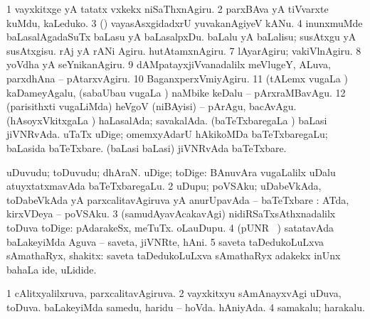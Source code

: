 {\noindent 
\gl{\pagu}
\expl{}
\bmng
\bnum
\num{1}  vayxkitxge yA tatatx vxkekx niSaThxnAgiru. 
\num{2}  parxBAva yA tiVvarxte kuMdu, kaLeduko. 
\num{3}  (\AmA) vayasAsxgidadxrU yuvakanAgiyeV kANu. 
\num{4}  
  
\banum
{} inunxmuMde baLasalAgadaSuTx baLasu yA baLasalpxDu. 
 baLalu yA baLalisu; susAtxgu yA susAtxgisu. 
\eanum
\numie
{}  
\banum
{} rAj yA rANi Agiru. 
 hutAtamxnAgiru. 
\eanum
\numie
\num{7}  lAyarAgiru; vakiVlnAgiru. 
\num{8}  yoVdha yA seYnikanAgiru. 
\num{9}  dAMpatayxjiVvanadalilx meVlugeY, ALuva, parxdhAna -- pAtarxvAgiru. 
\num{10}  BaganxperxVmiyAgiru. 
\num{11}  (tALemx \mo vugaLa \vi) kaDameyAgalu, (sabaUbau \mo vugaLa \vi) naMbike keDalu -- pArxraMBavAgu. 
\num{12}  (parisithxti \mo vugaLiMda) heVgoV (niBAyisi) -- pArAgu, bacAvAgu. 
  
\banum
{} (hAsoyxVkitxgaLa \vi) haLasalAda; savakalAda. 
 (baTeTxbaregaLa \vi) baLasi jiVNRvAda. 
\eanum
\numie
{}  
\banum
{} uTaTx uDige; omemxyAdarU hAkikoMDa baTeTxbaregaLu; baLasida baTeTxbare. 
 (baLasi baLasi) jiVNRvAda baTeTxbare. 
\eanum
\numie
\enum
\emng
\eentry

\bentry
{} 
\gl{\nA}
\expl{}
\bmng
\bnum
{} 
\banum
{} uDuvudu; toDuvudu; dhAraN. 
 uDige; toDige:  BAnuvAra \mo vugaLalilx uDalu atuyxtatxmavAda baTeTxbaregaLu. 
\eanum
\numie
\num{2} uDupu; poVSAku; uDabeVkAda, toDabeVkAda yA parxcalitavAgiruva yA anurUpavAda -- baTeTxbare :  ATda, kirxVDeya -- poVSAku. 
\num{3} (samudAyavAcakavAgi) nidiRSaTxsAthxnadalilx toDuva toDige:  pAdarakeSx, meTuTx.  oLauDupu. 
\num{4} (pUNR \parx\ ) satatavAda baLakeyiMda Aguva -- saveta, jiVNRte, hAni. 
\num{5} saveta taDedukoLuLxva sAmathaRyx, shakitx:  saveta taDedukoLuLxva sAmathaRyx adakekx inUnx bahaLa ide, uLidide. 
\enum
\emng

\noindent 
\gl{\pagu}
\expl{}
\bmng
\bnum
\num{1}  cAlitxyalilxruva, parxcalitavAgiruva. 
\num{2}  vayxkitxyu sAmAnayxvAgi uDuva, toDuva. 
  
\banum
{} baLakeyiMda samedu, haridu -- hoVda. 
 hAniyAda. 
\eanum
\numie
\num{4}  samakalu; harakalu. 
\enum
\emng
\eentry

}
